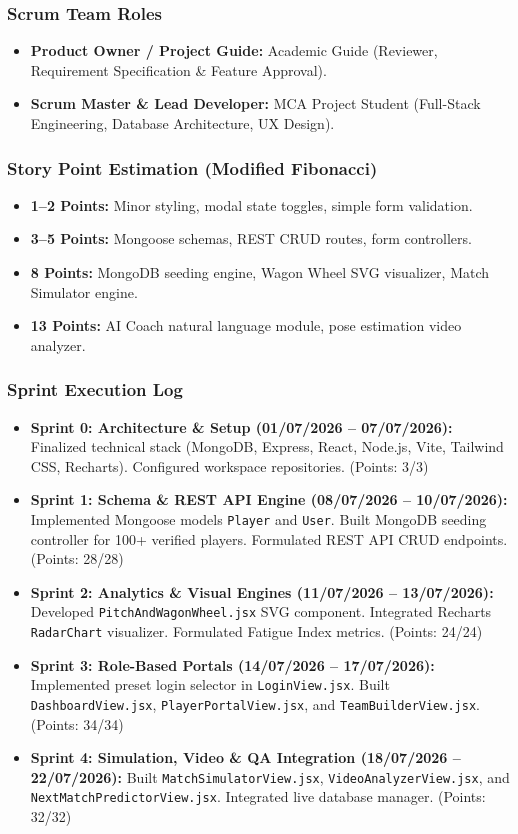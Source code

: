 \documentclass[12pt,a4paper]{report}
\begin{document}
\subsubsection{Scrum Team Roles}
\begin{itemize}
    \item \textbf{Product Owner / Project Guide:} Academic Guide (Reviewer, Requirement Specification \& Feature Approval).
    \item \textbf{Scrum Master \& Lead Developer:} MCA Project Student (Full-Stack Engineering, Database Architecture, UX Design).
\end{itemize}

\subsubsection{Story Point Estimation (Modified Fibonacci)}
\begin{itemize}
    \item \textbf{1--2 Points:} Minor styling, modal state toggles, simple form validation.
    \item \textbf{3--5 Points:} Mongoose schemas, REST CRUD routes, form controllers.
    \item \textbf{8 Points:} MongoDB seeding engine, Wagon Wheel SVG visualizer, Match Simulator engine.
    \item \textbf{13 Points:} AI Coach natural language module, pose estimation video analyzer.
\end{itemize}

\subsubsection{Sprint Execution Log}
\begin{itemize}
    \item \textbf{Sprint 0: Architecture \& Setup (01/07/2026 – 07/07/2026):} Finalized technical stack (MongoDB, Express, React, Node.js, Vite, Tailwind CSS, Recharts). Configured workspace repositories. (Points: 3/3)
    \item \textbf{Sprint 1: Schema \& REST API Engine (08/07/2026 – 10/07/2026):} Implemented Mongoose models \texttt{Player} and \texttt{User}. Built MongoDB seeding controller for 100+ verified players. Formulated REST API CRUD endpoints. (Points: 28/28)
    \item \textbf{Sprint 2: Analytics \& Visual Engines (11/07/2026 – 13/07/2026):} Developed \texttt{PitchAndWagonWheel.jsx} SVG component. Integrated Recharts \texttt{RadarChart} visualizer. Formulated Fatigue Index metrics. (Points: 24/24)
    \item \textbf{Sprint 3: Role-Based Portals (14/07/2026 – 17/07/2026):} Implemented preset login selector in \texttt{LoginView.jsx}. Built \texttt{DashboardView.jsx}, \texttt{PlayerPortalView.jsx}, and \texttt{TeamBuilderView.jsx}. (Points: 34/34)
    \item \textbf{Sprint 4: Simulation, Video \& QA Integration (18/07/2026 – 22/07/2026):} Built \texttt{MatchSimulatorView.jsx}, \texttt{VideoAnalyzerView.jsx}, and \texttt{NextMatchPredictorView.jsx}. Integrated live database manager. (Points: 32/32)
\end{itemize}
\end{document}

